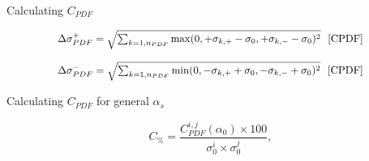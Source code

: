 \documentclass[14pt]{beamer}
\begin{document}
\begin{frame}[fragile]{Calculating ${C_{PDF}}$}
	
	
	{\renewcommand*{\normalfont}{\relax}
		\small
		\begin{equation}
		\resizebox{0.8\textwidth}{!}
		{ 
			$\Delta\sigma^+_{PDF} = \sqrt{\sum_{k=1,n_{PDF}} {\max(0, +\sigma_{k,+} - \sigma_0, +\sigma_{k,-} -\sigma_0)^2}} \     \ \cite{CPDF}$
		}  
		\end{equation} 
	}
	
	{\renewcommand*{\normalfont}{\relax}
		\small
		\begin{equation}
		\resizebox{0.8\textwidth}{!}
		{ 
			$\Delta\sigma^-_{PDF} = \sqrt{\sum_{k=1,n_{PDF}} {\min(0, -\sigma_{k,+} + \sigma_0, -\sigma_{k,-} +\sigma_0)^2}} \    \  \cite{CPDF}$
		}  
		\end{equation} 
	}
	
\end{frame}

\begin{frame}[fragile]{Calculating ${C_{PDF}}$ for general ${\alpha_s}$}
	
	\begin{equation} \label{PERREV} C_{\%} = \dfrac{C_{PDF}^{i,j}(\alpha_0) \times 100}{ \sigma_{0}^{i} \times  \sigma_{0}^{j}}, \end{equation} 
	
	
\end{frame}
\end{document}
